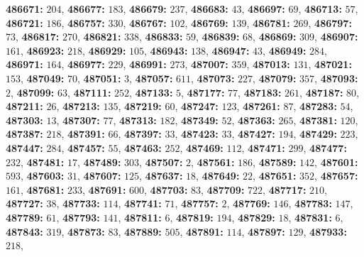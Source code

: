 \textsf{\bfseries 486671:} $204$, \textsf{\bfseries 486677:} $183$, \textsf{\bfseries 486679:} $237$, \textsf{\bfseries 486683:} $43$, \textsf{\bfseries 486697:} $69$, \textsf{\bfseries 486713:} $57$, \textsf{\bfseries 486721:} $186$, \textsf{\bfseries 486757:} $330$, \textsf{\bfseries 486767:} $102$, \textsf{\bfseries 486769:} $139$, \textsf{\bfseries 486781:} $269$, \textsf{\bfseries 486797:} $73$, \textsf{\bfseries 486817:} $270$, \textsf{\bfseries 486821:} $338$, \textsf{\bfseries 486833:} $59$, \textsf{\bfseries 486839:} $68$, \textsf{\bfseries 486869:} $309$, \textsf{\bfseries 486907:} $161$, \textsf{\bfseries 486923:} $218$, \textsf{\bfseries 486929:} $105$, \textsf{\bfseries 486943:} $138$, \textsf{\bfseries 486947:} $43$, \textsf{\bfseries 486949:} $284$, \textsf{\bfseries 486971:} $164$, \textsf{\bfseries 486977:} $229$, \textsf{\bfseries 486991:} $273$, \textsf{\bfseries 487007:} $359$, \textsf{\bfseries 487013:} $131$, \textsf{\bfseries 487021:} $153$, \textsf{\bfseries 487049:} $70$, \textsf{\bfseries 487051:} $3$, \textsf{\bfseries 487057:} $611$, \textsf{\bfseries 487073:} $227$, \textsf{\bfseries 487079:} $357$, \textsf{\bfseries 487093:} $2$, \textsf{\bfseries 487099:} $63$, \textsf{\bfseries 487111:} $252$, \textsf{\bfseries 487133:} $5$, \textsf{\bfseries 487177:} $77$, \textsf{\bfseries 487183:} $261$, \textsf{\bfseries 487187:} $80$, \textsf{\bfseries 487211:} $26$, \textsf{\bfseries 487213:} $135$, \textsf{\bfseries 487219:} $60$, \textsf{\bfseries 487247:} $123$, \textsf{\bfseries 487261:} $87$, \textsf{\bfseries 487283:} $54$, \textsf{\bfseries 487303:} $13$, \textsf{\bfseries 487307:} $77$, \textsf{\bfseries 487313:} $182$, \textsf{\bfseries 487349:} $52$, \textsf{\bfseries 487363:} $265$, \textsf{\bfseries 487381:} $120$, \textsf{\bfseries 487387:} $218$, \textsf{\bfseries 487391:} $66$, \textsf{\bfseries 487397:} $33$, \textsf{\bfseries 487423:} $33$, \textsf{\bfseries 487427:} $194$, \textsf{\bfseries 487429:} $223$, \textsf{\bfseries 487447:} $284$, \textsf{\bfseries 487457:} $55$, \textsf{\bfseries 487463:} $252$, \textsf{\bfseries 487469:} $112$, \textsf{\bfseries 487471:} $299$, \textsf{\bfseries 487477:} $232$, \textsf{\bfseries 487481:} $17$, \textsf{\bfseries 487489:} $303$, \textsf{\bfseries 487507:} $2$, \textsf{\bfseries 487561:} $186$, \textsf{\bfseries 487589:} $142$, \textsf{\bfseries 487601:} $593$, \textsf{\bfseries 487603:} $31$, \textsf{\bfseries 487607:} $125$, \textsf{\bfseries 487637:} $18$, \textsf{\bfseries 487649:} $22$, \textsf{\bfseries 487651:} $352$, \textsf{\bfseries 487657:} $161$, \textsf{\bfseries 487681:} $233$, \textsf{\bfseries 487691:} $600$, \textsf{\bfseries 487703:} $83$, \textsf{\bfseries 487709:} $722$, \textsf{\bfseries 487717:} $210$, \textsf{\bfseries 487727:} $38$, \textsf{\bfseries 487733:} $114$, \textsf{\bfseries 487741:} $71$, \textsf{\bfseries 487757:} $2$, \textsf{\bfseries 487769:} $146$, \textsf{\bfseries 487783:} $147$, \textsf{\bfseries 487789:} $61$, \textsf{\bfseries 487793:} $141$, \textsf{\bfseries 487811:} $6$, \textsf{\bfseries 487819:} $194$, \textsf{\bfseries 487829:} $18$, \textsf{\bfseries 487831:} $6$, \textsf{\bfseries 487843:} $319$, \textsf{\bfseries 487873:} $83$, \textsf{\bfseries 487889:} $505$, \textsf{\bfseries 487891:} $114$, \textsf{\bfseries 487897:} $129$, \textsf{\bfseries 487933:} $218$, 
